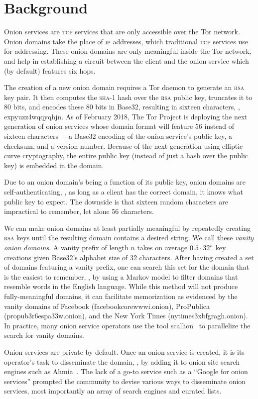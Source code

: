 \section{Background}
\label{sec:background}

Onion services are \textsc{tcp} services that are only accessible over the Tor
network.  Onion domains take the place of \textsc{ip} addresses, which
traditional \textsc{tcp} services use for addressing.  These onion domains are
only meaningful inside the Tor network, and help in establishing a circuit
between the client and the onion service which (by default) features six hops.

The creation of a new onion domain requires a Tor daemon to generate an
\textsc{rsa} key pair.  It then computes the \textsc{sha}-1 hash over the
\textsc{rsa} public key, truncates it to 80 bits, and encodes these 80 bits in
Base32, resulting in sixteen characters, \eg, expyuzz4wqqyqhjn.  As of February
2018, The Tor Project is deploying the next generation of onion services whose
domain format will feature 56 instead of sixteen
characters~\cite[\S~6]{Mathewson2013a}---a Base32 encoding of the onion
service's public key, a checksum, and a version number.  Because of the next
generation using elliptic curve cryptography, the entire public key (instead of
just a hash over the public key) is embedded in the domain.

Due to an onion domain's being a function of its public key, onion domains are
self-authenticating, \ie, as long as a client has the correct domain, it knows
what public key to expect.  The downside is that sixteen random characters are
impractical to remember, let alone 56 characters.

We can make onion domains at least partially meaningful by repeatedly creating
\textsc{rsa} keys until the resulting domain contains a desired string.  We call
these \emph{vanity onion domains}.  A vanity prefix of length $n$ takes on
average $0.5 \cdot 32^n$ key creations given Base32's alphabet size of 32
characters.  After having created a set of domains featuring a vanity prefix,
one can search this set for the domain that is the easiest to remember, \eg, by
using a Markov model to filter domains that resemble words in the English
language.  While this method will not produce fully-meaningful domains, it can
facilitate memorization as evidenced by the vanity domains of Facebook
(facebookcorewwwi.onion), ProPublica (propub3r6espa33w.onion), and the New York
Times (nytimes3xbfgragh.onion).  In practice, many onion service operators use
the tool scallion~\cite{scallion} to parallelize the search for vanity domains.

Onion services are private by default.  Once an onion service is created, it is
its operator's task to disseminate the domain, \eg, by adding it to onion site
search engines such as Ahmia~\cite{ahmia}.  The lack of a go-to service such as
a ``Google for onion services'' prompted the community to devise various ways to
disseminate onion services, most importantly an array of search engines and
curated lists.
